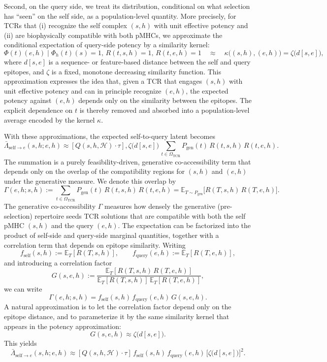 \documentclass[11pt]{article}
\begin{document}
Second, on the query side, we treat its distribution, conditional on what selection has ``seen'' on the self side, as a population-level quantity. More precisely, for TCRs that (i) recognize the self complex \((s,h)\) with unit effective potency and (ii) are biophysically compatible with both pMHCs, we approximate the conditional expectation of query-side potency by a similarity kernel:
\[
\Phi(t)(e,h)
\;\big|\;
\Phi_{h}(t)(s)=1,\,
R(t,s,h)=1,\,
R(t,e,h)=1
\quad\approx\quad
\kappa\!\big((s,h),(e,h)\big)
=
\zeta\big(d[s,e]\big),
\]
where \(d[s,e]\) is a sequence- or feature-based distance between the self and query epitopes, and \(\zeta\) is a fixed, monotone decreasing similarity function. This approximation expresses the idea that, given a TCR that engages \((s,h)\) with unit effective potency and can in principle recognize \((e,h)\), the expected potency against \((e,h)\) depends only on the similarity between the epitopes. The explicit dependence on \(t\) is thereby removed and absorbed into a population-level average encoded by the kernel \(\kappa\).

With these approximations, the expected self-to-query latent becomes
\[
\bar{\Lambda}_{\mathrm{self}\to e}(s,h; e,h)
\approx
[Q(s,h,\mathcal{H})\cdot \tau],\zeta\big(d[s,e]\big)\,
\sum_{t\in\Omega_{\mathrm{TCR}}}
P_{\mathrm{gen}}(t)\,
R(t,s,h)\,
R(t,e,h).
\]
The summation is a purely feasibility-driven, generative co-accessibility term that depends only on the overlap of the compatibility regions for \((s,h)\) and \((e,h)\) under the generative measure. We denote this overlap by
\[
\Gamma(e,h; s,h)
:=
\sum_{t\in\Omega_{\mathrm{TCR}}}
P_{\mathrm{gen}}(t)\,
R(t,s,h)\,
R(t,e,h)
= \mathbb{E}_{T\sim P_{\mathrm{gen}}}\bigl[R(T,s,h)\,R(T,e,h)\bigr].
\]
The generative co-accessibility $\Gamma$ measures how densely the generative (pre-selection) repertoire seeds TCR solutions that are compatible with both the self pMHC \((s,h)\) and the query \((e,h)\). The expectation can be factorized into the product of self-side and query-side marginal quantities, together with a correlation term that depends on epitope similarity. Writing
\[
f_{\mathrm{self}}(s,h)
:=
\mathbb{E}_{T}[R(T,s,h)],\qquad
f_{\mathrm{query}}(e,h)
:=
\mathbb{E}_{T}[R(T,e,h)],
\]
and introducing a correlation factor
\[
G(s,e,h)
:=
\frac{\mathbb{E}_{T}[R(T,s,h)\,R(T,e,h)]}
     {\mathbb{E}_{T}[R(T,s,h)]\,\mathbb{E}_{T}[R(T,e,h)]},
\]
we can write
\[
\Gamma(e,h;s,h)
=
f_{\mathrm{self}}(s,h)\,f_{\mathrm{query}}(e,h)\,G(s,e,h).
\]
A natural approximation is to let the correlation factor depend only on the epitope distance, and to parameterize it by the same similarity kernel that appears in the potency approximation:
\[
G(s,e,h) \approx \zeta\big(d[s,e]\big).
\]
This yields
\[
\bar{\Lambda}_{\mathrm{self}\to e}(s,h; e,h)
\approx
[Q(s,h,\mathcal{H})\cdot \tau]\, 
f_{\mathrm{self}}(s,h)\,
f_{\mathrm{query}}(e,h)\,
\bigl[\zeta\big(d[s,e]\big)\bigr]^2.
\]
\end{document}

